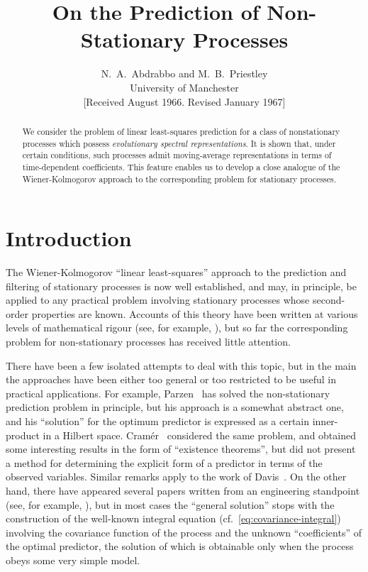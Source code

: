 \documentclass[11pt]{article}
\title{On the Prediction of Non-Stationary Processes}
\author{
  N.~A.~Abdrabbo and M.~B.~Priestley \\
  University of Manchester \\
  \small{[Received August 1966. Revised January 1967]}
}
\date{}
\begin{document}
\maketitle

\begin{abstract}
We consider the problem of linear least-squares prediction for a class of nonstationary processes which possess \emph{evolutionary spectral representations}. It is shown that, under certain conditions, such processes admit moving-average representations in terms of time-dependent coefficients. This feature enables us to develop a close analogue of the Wiener-Kolmogorov approach to the corresponding problem for stationary processes.
\end{abstract}

\section{Introduction}

The Wiener-Kolmogorov ``linear least-squares'' approach to the prediction and filtering of stationary processes is now well established, and may, in principle, be applied to any practical problem involving stationary processes whose second-order properties are known. Accounts of this theory have been written at various levels of mathematical rigour (see, for example, \cite{Doob1953,Bartlett1955,GrenanderRosenblatt1957,Yaglom1962,Whittle1965}), but so far the corresponding problem for non-stationary processes has received little attention.

There have been a few isolated attempts to deal with this topic, but in the main the approaches have been either too general or too restricted to be useful in practical applications. For example, Parzen~\cite{Parzen1961} has solved the non-stationary prediction problem in principle, but his approach is a somewhat abstract one, and his ``solution'' for the optimum predictor is expressed as a certain inner-product in a Hilbert space. Cramér~\cite{Cramer1961a,Cramer1961b} considered the same problem, and obtained some interesting results in the form of ``existence theorems'', but did not present a method for determining the explicit form of a predictor in terms of the observed variables. Similar remarks apply to the work of Davis~\cite{Davis1952}. On the other hand, there have appeared several papers written from an engineering standpoint (see, for example, \cite{Booton1952,Zadeh1953,Bendat1956}), but in most cases the ``general solution'' stops with the construction of the well-known integral equation (cf.~\eqref{eq:covariance-integral}) involving the covariance function of the process and the unknown ``coefficients'' of the optimal predictor, the solution of which is obtainable only when the process obeys some very simple model.
\end{document}
